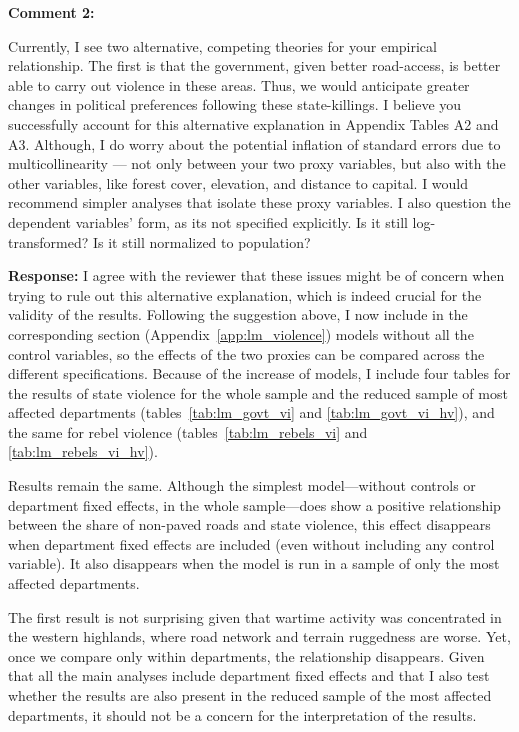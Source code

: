 \documentclass[12pt, a4paper, notitlepage]{article}
\begin{document}
\vspace{15pt}
\noindent\textbf{Comment 2:}
\begin{displayquote}
Currently, I see two alternative, competing theories for your empirical relationship. The first is that the government, given better road-access, is better able to carry out violence in these areas. Thus, we would anticipate greater changes in political preferences following these state-killings. I believe you successfully account for this alternative explanation in Appendix Tables A2 and A3. Although, I do worry about the potential inflation of standard errors due to multicollinearity — not only between your two proxy variables, but also with the other variables, like forest cover, elevation, and distance to capital. I would recommend simpler analyses that isolate these proxy variables. I also question the dependent variables’ form, as its not specified explicitly. Is it still log- transformed? Is it still normalized to population?
\end{displayquote}

\noindent\textbf{Response:} I agree with the reviewer that these issues might be of concern when trying to rule out this alternative explanation, which is indeed crucial for the validity of the results. Following the suggestion above, I now include in the corresponding section (Appendix~\ref{app:lm_violence}) models without all the control variables, so the effects of the two proxies can be compared across the different specifications.
Because of the increase of models, I include four tables for the results of state violence for the whole sample and the reduced sample of most affected departments (tables~\ref{tab:lm_govt_vi} and \ref{tab:lm_govt_vi_hv}), and the same for rebel violence (tables~\ref{tab:lm_rebels_vi} and \ref{tab:lm_rebels_vi_hv}).

Results remain the same. Although the simplest model---without controls or department fixed effects, in the whole sample---does show a positive relationship between the share of non-paved roads and state violence, this effect disappears when department fixed effects are included (even without including any control variable). It also disappears when the model is run in a sample of only the most affected departments.

The first result is not surprising given that wartime activity was concentrated in the western highlands, where road network and terrain ruggedness are worse. Yet, once we compare only within departments, the relationship disappears.
Given that all the main analyses include department fixed effects and that I also test whether the results are also present in the reduced sample of the most affected departments, it should not be a concern for the interpretation of the results.
\end{document}
